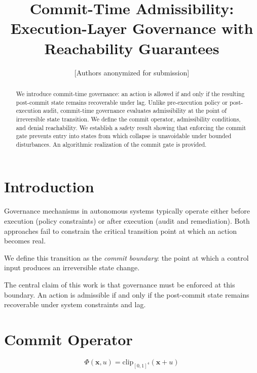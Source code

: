 \documentclass[letterpaper, 10 pt, conference]{ieeeconf}
\title{\bf Commit-Time Admissibility: Execution-Layer Governance with Reachability Guarantees}
\author{[Authors anonymized for submission]}
\begin{document}
\maketitle
\thispagestyle{empty}
\pagestyle{empty}

\begin{abstract}
We introduce commit-time governance: an action is allowed if and only if the resulting post-commit state remains recoverable under lag. Unlike pre-execution policy or post-execution audit, commit-time governance evaluates admissibility at the point of irreversible state transition. We define the commit operator, admissibility conditions, and denial reachability. We establish a safety result showing that enforcing the commit gate prevents entry into states from which collapse is unavoidable under bounded disturbances. An algorithmic realization of the commit gate is provided.
\end{abstract}

\section{Introduction}

Governance mechanisms in autonomous systems typically operate either before execution (policy constraints) or after execution (audit and remediation). Both approaches fail to constrain the critical transition point at which an action becomes real.

We define this transition as the \textit{commit boundary}: the point at which a control input produces an irreversible state change.

The central claim of this work is that governance must be enforced at this boundary. An action is admissible if and only if the post-commit state remains recoverable under system constraints and lag.

\section{Commit Operator}

\begin{definition}
\begin{equation}
\Phi(\mathbf{x}, u) = \text{clip}_{[0,1]^4}(\mathbf{x} + u)
\end{equation}
\end{definition}
\end{document}
